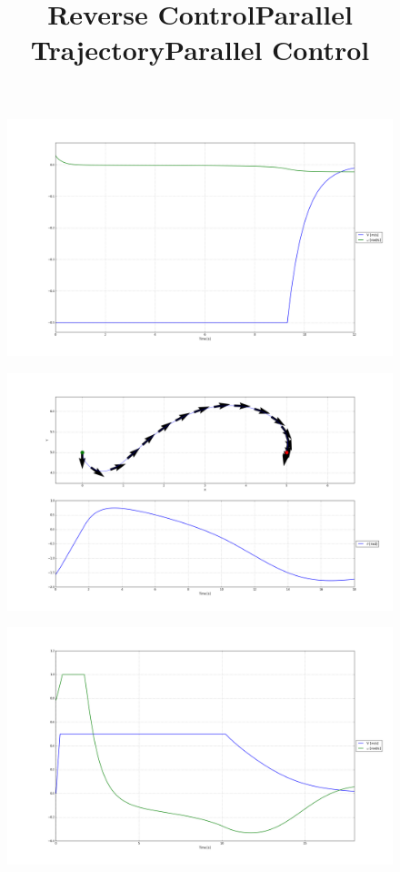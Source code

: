 \documentclass[12pt]{article}
\begin{document}
\begin{enumerate}
\begin{figure}[H]
	\end{figure}
	\begin{figure}[H]
		\centering
		\title{\bf Reverse Control}
		\includegraphics[width=\textwidth]{../Figures/hw1_3_ii_b_reverse.png}
	\end{figure}
	\begin{figure}[H]
		\centering
		\title{\bf Parallel Trajectory}
		\includegraphics[width=\textwidth]{../Figures/hw1_3_ii_a_parallel.png}
	\end{figure}
	\begin{figure}[H]
		\centering
		\title{\bf Parallel Control}
		\includegraphics[width=\textwidth]{../Figures/hw1_3_ii_b_parallel.png}
	\end{figure}
\end{enumerate}
\end{document}
